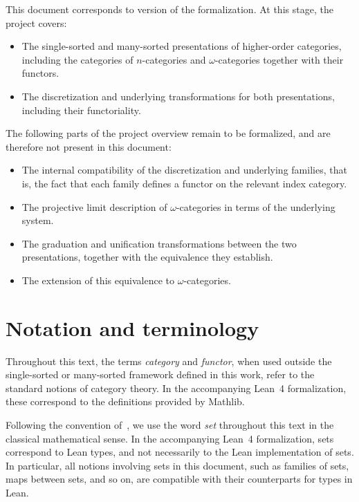 This document corresponds to version \version{} of the formalization. At this stage, the project
covers:

\begin{itemize}
  \item The single-sorted and many-sorted presentations of higher-order categories, including the
    categories of $n$-categories and $\omega$-categories together with their functors.
  \item The discretization and underlying transformations for both presentations, including their
    functoriality.
\end{itemize}

The following parts of the project overview remain to be formalized, and are therefore not present
in this document:

\begin{itemize}
  \item The internal compatibility of the discretization and underlying families, that is, the
    fact that each family defines a functor on the relevant index category.
  \item The projective limit description of $\omega$-categories in terms of the underlying system.
  \item The graduation and unification transformations between the two presentations, together
    with the equivalence they establish.
  \item The extension of this equivalence to $\omega$-categories.
\end{itemize}

\section{Notation and terminology}

Throughout this text, the terms \emph{category} and \emph{functor}, when used outside the
single-sorted or many-sorted framework defined in this work, refer to the standard notions of
category theory. In the accompanying Lean~4 formalization, these correspond to the definitions
provided by Mathlib.

\begin{notation}
  \label{not:types_vs_sets}
  Following the convention of~\cite{vidal2024higher}, we use the word \emph{set} throughout this
  text in the classical mathematical sense. In the accompanying Lean~4 formalization, sets
  correspond to Lean types, and not necessarily to the Lean implementation of sets. In particular,
  all notions involving sets in this document, such as families of sets, maps between sets, and so
  on, are compatible with their counterparts for types in Lean.
\end{notation}

